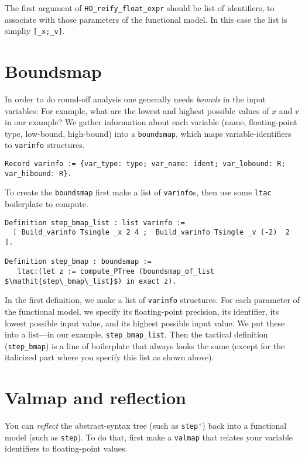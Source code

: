 \documentclass[article]{memoir}
\begin{document}
The first argument of \lstinline{HO_reify_float_expr}
should be list of identifiers, to associate with those
parameters of the functional model.  In this case the list is
simpliy \lstinline{[_x;_v]}.

\chapter{Boundsmap}

In order to do round-off analysis one generally needs \emph{bounds}
in the input variables:
For example, what are the lowest and highest possible
values of $x$ and $v$ in our example?
We gather information about each variable
(name, floating-point type, low-bound, high-bound) into
a \lstinline{boundsmap}, which maps variable-identifiers to
\lstinline{varinfo} structures.
\begin{lstlisting}
Record varinfo := {var_type: type; var_name: ident; var_lobound: R; var_hibound: R}.
\end{lstlisting}

To create the \lstinline{boundsmap}
first make a list of \lstinline{varinfo}s,
then use some \lstinline{ltac} boilerplate to compute.
\begin{lstlisting}
Definition step_bmap_list : list varinfo := 
  [ Build_varinfo Tsingle _x 2 4 ;  Build_varinfo Tsingle _v (-2)  2 ].

Definition step_bmap : boundsmap :=
   ltac:(let z := compute_PTree (boundsmap_of_list $\mathit{step\_bmap\_list}$) in exact z).
\end{lstlisting}
In the first definition, we make a list of \lstinline{varinfo} structures.
For each parameter of the functional model, we specify its floating-point precision, its identifier, its lowest possible input value,
and its highest possible input value.  
We put these into a list---in our example, \lstinline{step_bmap_list}.
Then the tactical definition (\lstinline{step_bmap}) is
a line of boilerplate that always looks the same
(except for the italicized part where you specify this list
as shown above).


\chapter{Valmap and reflection}
\label{valmap}

You can \emph{reflect} the abstract-syntax tree (such as \lstinline{step'})
back into a functional model (such as \lstinline{step}).
To do that, first make a \lstinline{valmap} that relates your
variable identifiers to floating-point values.
\end{document}
